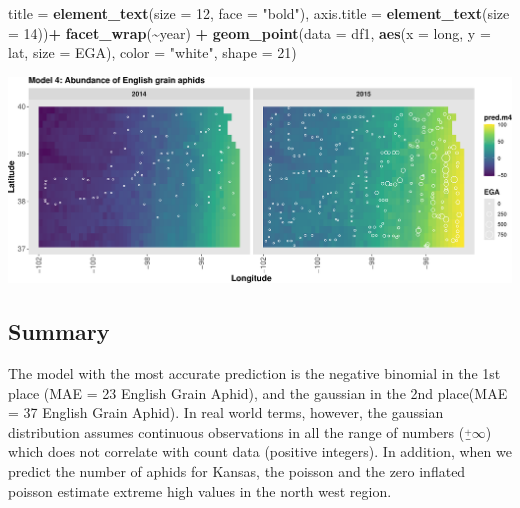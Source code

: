 \documentclass[
]{book}
\newenvironment{Shaded}{\begin{snugshade}}{\end{snugshade}}
\newcommand{\AttributeTok}[1]{\textcolor[rgb]{0.13,0.29,0.53}{#1}}
\newcommand{\DecValTok}[1]{\textcolor[rgb]{0.00,0.00,0.81}{#1}}
\newcommand{\FunctionTok}[1]{\textcolor[rgb]{0.13,0.29,0.53}{\textbf{#1}}}
\newcommand{\NormalTok}[1]{#1}
\newcommand{\SpecialCharTok}[1]{\textcolor[rgb]{0.81,0.36,0.00}{\textbf{#1}}}
\newcommand{\StringTok}[1]{\textcolor[rgb]{0.31,0.60,0.02}{#1}}
\begin{document}
\begin{Shaded}
\begin{Highlighting}[]
        \AttributeTok{title =} \FunctionTok{element\_text}\NormalTok{(}\AttributeTok{size =} \DecValTok{12}\NormalTok{, }\AttributeTok{face =} \StringTok{"bold"}\NormalTok{),}
        \AttributeTok{axis.title =} \FunctionTok{element\_text}\NormalTok{(}\AttributeTok{size =} \DecValTok{14}\NormalTok{))}\SpecialCharTok{+}
  \FunctionTok{facet\_wrap}\NormalTok{(}\SpecialCharTok{\textasciitilde{}}\NormalTok{year) }\SpecialCharTok{+}
  \FunctionTok{geom\_point}\NormalTok{(}\AttributeTok{data =}\NormalTok{ df1, }\FunctionTok{aes}\NormalTok{(}\AttributeTok{x =}\NormalTok{ long, }\AttributeTok{y =}\NormalTok{ lat, }\AttributeTok{size =}\NormalTok{ EGA), }\AttributeTok{color =} \StringTok{"white"}\NormalTok{, }\AttributeTok{shape =} \DecValTok{21}\NormalTok{) }
\end{Highlighting}
\end{Shaded}

\includegraphics{_main_files/figure-latex/unnamed-chunk-41-1.pdf}

\hypertarget{summary}{%
\subsection{Summary}\label{summary}}

The model with the most accurate prediction is the negative binomial in the 1st place (MAE = 23 English Grain Aphid), and the gaussian in the 2nd place(MAE = 37 English Grain Aphid). In real world terms, however, the gaussian distribution assumes continuous observations in all the range of numbers (\(\overset{+}{\_} \infty\)) which does not correlate with count data (positive integers). In addition, when we predict the number of aphids for Kansas, the poisson and the zero inflated poisson estimate extreme high values in the north west region.

  
\end{document}
